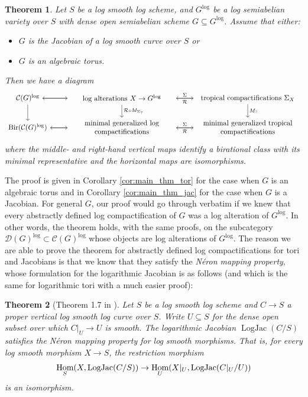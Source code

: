 \documentclass[11pt]{amsart}
\newtheorem{theorem}{Theorem}[section]
\theoremstyle{definition}
\theoremstyle{remark}
\DeclareMathOperator{\LogJac}{LogJac}
\def\log{\mathrm{log}}
\DeclareMathOperator{\Hom}{\textup{Hom}}
\begin{document}
\begin{theorem}
	Let $S$ be a log smooth log scheme, and $G^{\log}$ be a log semiabelian variety over $S$ with dense open semiabelian scheme $G\subseteq G^{\log}$.
	Assume that either:
\begin{itemize}
	\item $G$ is the Jacobian of a log smooth curve over $S$ or
	\item $G$ is an algebraic torus.
\end{itemize}
	Then we have a diagram
	\[
	\begin{tikzcd}
		\mathcal{C}(G)^{\log}	\ar[d] \ar[r] & \ar[l] \parbox{5cm}{\centering log alterations $X \to G^{\log}$} \ar[r,"\Sigma"] \ar[d,"\mathcal{R} \circ M_{\Sigma_{?}}"] & \ar[l,"\mathcal{R}"] \parbox{5cm}{\centering tropical compactifications $\Sigma_X$} \ar[d,"M_{?}"] \\
		\textup{Bir}(\mathcal{C}(G)^{\log})	\ar[r]   & \ar[l] \parbox{5cm}{\centering minimal generalized log compactifications} \ar[r,"\Sigma"] & \ar[l,"\mathcal{R}"] \parbox{5cm}{\centering minimal generalized tropical compactifications}
	\end{tikzcd}
	\]
	where the middle- and right-hand vertical maps identify a birational class with its minimal representative and the horizontal maps are isomorphisms.
\end{theorem}


The proof is given in Corollary \ref{cor:main_thm_tor} for the case when $G$ is an algebraic torus
and in Corollary \ref{cor:main_thm_jac} for the case when $G$ is a Jacobian. For general $G$, our proof would go through verbatim if we knew that every abstractly defined log compactification of $G$ was a log alteration of $G^{\log}$. In other words, the theorem holds, with the same proofs, on the subcategory $\mathcal{D}(G)^{\log} \subset \mathcal{C}(G)^{\log}$ whose objects are log alterations of $G^{\log}$. The reason we are able to prove the theorem for abstractly defined log compactifications for tori and Jacobians is that we know that they satisfy the \emph{Néron mapping property}, whose formulation for the logarithmic Jacobian is as follows (and which is the same for logarithmic tori with a much easier proof):

\begin{theorem}[Theorem 1.7 in \cite{ModelsOfJacobHolmes2020}]
	Let $S$ be a log smooth log scheme and $C\to S$ a proper vertical log smooth log curve over $S$.
	Write $U\subseteq S$ for the dense open subset over which $C|_U\to U$ is smooth.
	The logarithmic Jacobian $\LogJac(C/S)$ satisfies the Néron mapping
	property for log smooth morphisms. That is, for every log smooth morphism
	$X\to S$, the restriction morphism
	$$\Hom_S(X,\LogJac(C/S))\to \Hom_U(X|_U,\LogJac(C|_U/U))$$
	is an isomorphism.
\end{theorem}
\end{document}
